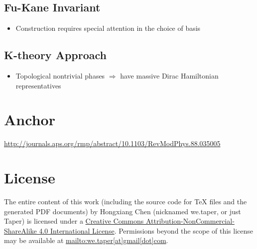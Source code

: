 \documentclass{article}
\begin{document}
\subsection{Fu-Kane Invariant}
\label{sec:Fu-Kane-Invariant}
\begin{itemize}
    \item Construction requires special attention in the choice of basis
\end{itemize}

\subsection{K-theory Approach}
\label{sec:K-theory-Approach}
\begin{itemize}
    \item Topological nontrivial phases $\Rightarrow$ have massive
        Dirac Hamiltonian representatives
\end{itemize}
\section{Anchor}
\label{sec:Anchor}

\begin{thebibliography}{1}
    \url{http://journals.aps.org/rmp/abstract/10.1103/RevModPhys.88.035005}
\end{thebibliography}
\printnomenclature
\section{License}
The entire content of this work (including the source code
for TeX files and the generated PDF documents) by 
Hongxiang Chen (nicknamed we.taper, or just Taper) is
licensed under a 
\href{http://creativecommons.org/licenses/by-nc-sa/4.0/}{Creative 
Commons Attribution-NonCommercial-ShareAlike 4.0 International 
License}. Permissions beyond the scope of this 
license may be available at \url{mailto:we.taper[at]gmail[dot]com}.
\end{document}
